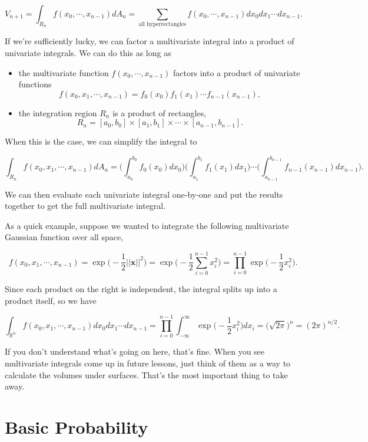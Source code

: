 \documentclass[
  letterpaper,
  DIV=11,
  numbers=noendperiod]{scrreprt}
\providecommand{\tightlist}{%
  \setlength{\itemsep}{0pt}\setlength{\parskip}{0pt}}\usepackage{longtable,booktabs,array}
\begin{document}
\[V_{n+1} = \int_{R_n} f(x_0,\cdots,x_{n-1}) dA_n = \sum_{\text{all hyperrectangles}} f(x_0,\cdots,x_{n-1}) dx_0dx_1\cdots dx_{n-1}.\]

If we're sufficiently lucky, we can factor a multivariate integral into
a product of univariate integrals. We can do this as long as

\begin{itemize}
\tightlist
\item
  the multivariate function \(f(x_0,\cdots,x_{n-1})\) factors into a
  product of univariate functions
  \[f(x_0,x_1,\cdots,x_{n-1}) = f_0(x_0) f_1(x_1) \cdots f_{n-1}(x_{n-1}),\]
\item
  the integration region \(R_n\) is a product of rectangles,
  \[R_n = [a_0,b_0] \times [a_1,b_1] \times \cdots \times [a_{n-1},b_{n-1}].\]
\end{itemize}

When this is the case, we can simplify the integral to

\[\int_{R_n} f(x_0,x_1,\cdots,x_{n-1}) dA_n = \bigg(\int_{a_0}^{b_0} f_0(x_0) dx_0\bigg) \bigg(\int_{a_1}^{b_1} f_1(x_1) dx_1\bigg) \cdots \bigg(\int_{a_{n-1}}^{b_{n-1}} f_{n-1}(x_{n-1}) dx_{n-1}\bigg).\]

We can then evaluate each univariate integral one-by-one and put the
results together to get the full multivariate integral.

As a quick example, suppose we wanted to integrate the following
multivariate Gaussian function over all space,

\[f(x_0,x_1,\cdots,x_{n-1}) = \exp\bigg(-\frac{1}{2}||\mathbf{x}||^2\bigg) = \exp\bigg(-\frac{1}{2}\sum_{i=0}^{n-1}x_i^2\bigg) = \prod_{i=0}^{n-1} \exp\bigg(-\frac{1}{2}x_i^2\bigg).\]

Since each product on the right is independent, the integral splits up
into a product itself, so we have

\[\int_{\mathbb{R}^n} f(x_0,x_1,\cdots,x_{n-1}) dx_0dx_1\cdots dx_{n-1} = \prod_{i=0}^{n-1} \int_{-\infty}^\infty \exp\bigg(-\frac{1}{2}x_i^2\bigg) dx_i = \big(\sqrt{2\pi}\big)^n = (2\pi)^{n/2}.\]

If you don't understand what's going on here, that's fine. When you see
multivariate integrals come up in future lessons, just think of them as
a way to calculate the volumes under surfaces. That's the most important
thing to take away.


\hypertarget{basic-probability}{%
\chapter{Basic Probability}\label{basic-probability}}
\end{document}
